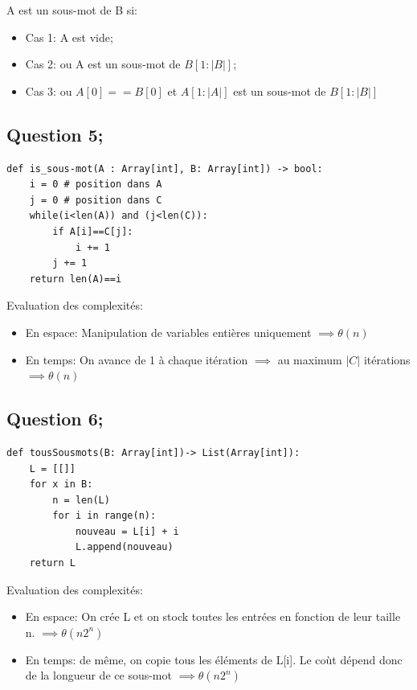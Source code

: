 \documentclass{article}
\begin{document}
A est un sous-mot de B si:
\begin{itemize}
    \item Cas 1: A est vide;
    \item Cas 2: ou A est un sous-mot de $ B[1:|B|]$;
    \item Cas 3: ou $ A[0] == B[0] $ et $ A[1:|A|] $ est un sous-mot de $ B[1:|B|]$
\end{itemize}

\subsection*{Question 5;}

\begin{lstlisting}[label=python, caption={\textit{is\_sous-mot}}]
def is_sous-mot(A : Array[int], B: Array[int]) -> bool:
    i = 0 # position dans A
    j = 0 # position dans C
    while(i<len(A)) and (j<len(C)):
        if A[i]==C[j]:
            i += 1
        j += 1
    return len(A)==i
\end{lstlisting}

Evaluation des complexités:
\begin{itemize}
    \item En espace: Manipulation de variables entières uniquement $ \implies  \theta(n) $
    \item En temps: On avance de 1 à chaque itération $ \implies $ au maximum $ |C| $ itérations $ \implies  \theta(n) $
\end{itemize}

\subsection*{Question 6;}

\begin{lstlisting}[label=python, caption={\textit{tousSousmots}}]
def tousSousmots(B: Array[int])-> List(Array[int]):
    L = [[]]
    for x in B:
        n = len(L)
        for i in range(n):
            nouveau = L[i] + i
            L.append(nouveau)
    return L
\end{lstlisting}

Evaluation des complexités:
\begin{itemize}
    \item En espace: On crée L et on stock toutes les entrées en fonction de leur taille n. $ \implies \theta(n2^n) $
    \item En temps: de même, on copie tous les éléments de L[i]. Le coùt dépend donc de la longueur de ce sous-mot $ \implies \theta(n2^n) $
\end{itemize}
\end{document}
